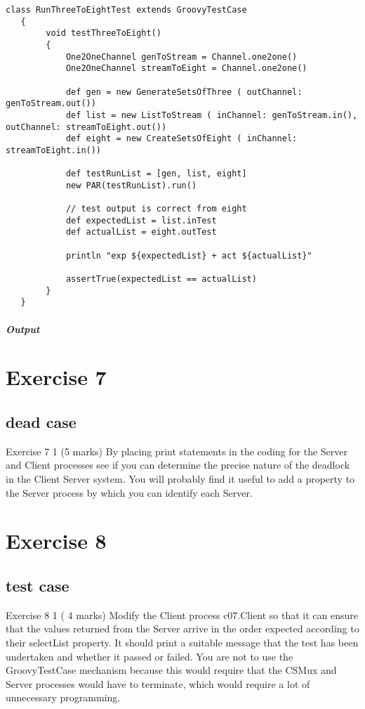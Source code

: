 \documentclass[10pt, a4paper]{article}
\begin{document}
   \begin{lstlisting}[caption = "RunThreeToEightTest.groovy"]
   class RunThreeToEightTest extends GroovyTestCase
   {
   		void testThreeToEight()
   		{
   			One2OneChannel genToStream = Channel.one2one()
  	 		One2OneChannel streamToEight = Channel.one2one()
   
  			def gen = new GenerateSetsOfThree ( outChannel: genToStream.out())
   			def list = new ListToStream ( inChannel: genToStream.in(), outChannel: streamToEight.out())
   			def eight = new CreateSetsOfEight ( inChannel: streamToEight.in())
   
   			def testRunList = [gen, list, eight]
   			new PAR(testRunList).run()
   
   			// test output is correct from eight
   			def expectedList = list.inTest
   			def actualList = eight.outTest
   
   			println "exp ${expectedList} + act ${actualList}"
   
   			assertTrue(expectedList == actualList)
   		}
   }   \end{lstlisting}
   
   \subparagraph{Output}
   
   	\setcounter{section}{7}
	\section*{Exercise 7}
	
	
	\setcounter{subsection}{0}
	\subsection{dead case}
	   Exercise 7 1   (5 marks)
	By placing print statements in the coding for the Server and Client processes see if you can determine the precise nature of the deadlock in the Client Server system.  You will probably find it useful to add a property to the Server process by which you can identify each Server.  


	\setcounter{section}{8}
   \section*{Exercise 8}
   
   \setcounter{subsection}{0}
   \subsection{test case}

   Exercise 8 1   ( 4 marks)
   Modify the Client process c07.Client so that it can ensure that the values returned from the Server arrive in the order expected according to their selectList property.  It should print a suitable message that the test has been undertaken and whether it passed or failed.  You are not to use the GroovyTestCase mechanism because this would require that the CSMux and Server processes would have to terminate, which would require a lot of unnecessary programming.  
   
\end{document}
